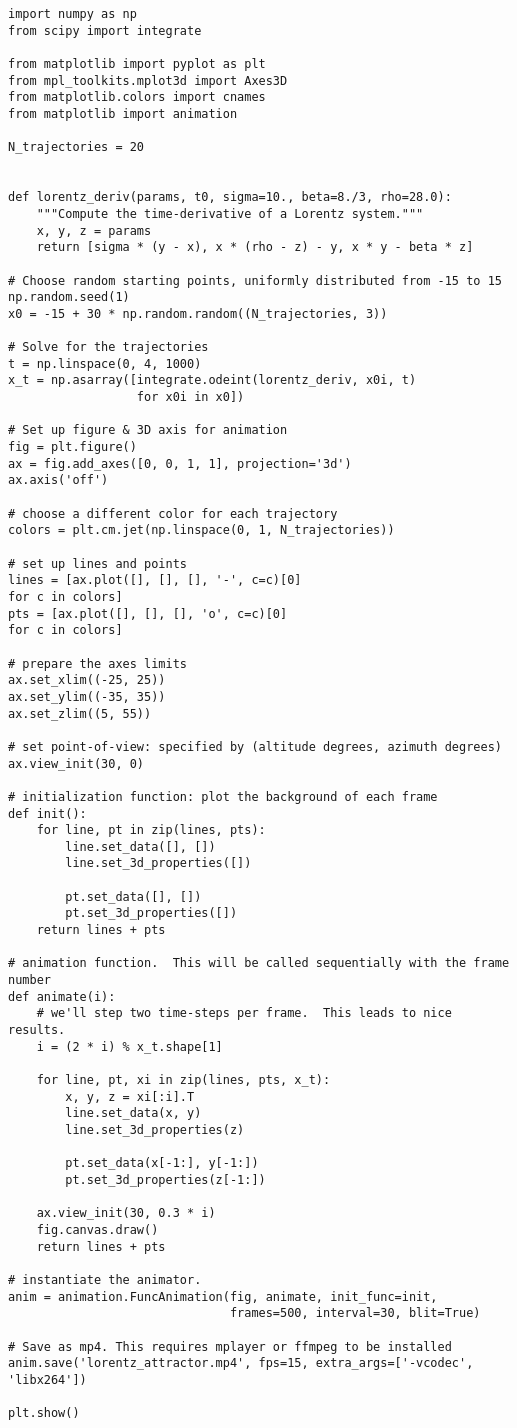 \documentclass[12pt]{article}
\begin{document}
\begin{verbatim}
import numpy as np
from scipy import integrate

from matplotlib import pyplot as plt
from mpl_toolkits.mplot3d import Axes3D
from matplotlib.colors import cnames
from matplotlib import animation

N_trajectories = 20


def lorentz_deriv(params, t0, sigma=10., beta=8./3, rho=28.0):
    """Compute the time-derivative of a Lorentz system."""
    x, y, z = params
    return [sigma * (y - x), x * (rho - z) - y, x * y - beta * z]

# Choose random starting points, uniformly distributed from -15 to 15
np.random.seed(1)
x0 = -15 + 30 * np.random.random((N_trajectories, 3))

# Solve for the trajectories
t = np.linspace(0, 4, 1000)
x_t = np.asarray([integrate.odeint(lorentz_deriv, x0i, t)
                  for x0i in x0])

# Set up figure & 3D axis for animation
fig = plt.figure()
ax = fig.add_axes([0, 0, 1, 1], projection='3d')
ax.axis('off')

# choose a different color for each trajectory
colors = plt.cm.jet(np.linspace(0, 1, N_trajectories))

# set up lines and points
lines = [ax.plot([], [], [], '-', c=c)[0]
for c in colors]
pts = [ax.plot([], [], [], 'o', c=c)[0]
for c in colors]

# prepare the axes limits
ax.set_xlim((-25, 25))
ax.set_ylim((-35, 35))
ax.set_zlim((5, 55))

# set point-of-view: specified by (altitude degrees, azimuth degrees)
ax.view_init(30, 0)

# initialization function: plot the background of each frame
def init():
    for line, pt in zip(lines, pts):
        line.set_data([], [])
        line.set_3d_properties([])

        pt.set_data([], [])
        pt.set_3d_properties([])
    return lines + pts

# animation function.  This will be called sequentially with the frame number
def animate(i):
    # we'll step two time-steps per frame.  This leads to nice results.
    i = (2 * i) % x_t.shape[1]

    for line, pt, xi in zip(lines, pts, x_t):
        x, y, z = xi[:i].T
        line.set_data(x, y)
        line.set_3d_properties(z)

        pt.set_data(x[-1:], y[-1:])
        pt.set_3d_properties(z[-1:])

    ax.view_init(30, 0.3 * i)
    fig.canvas.draw()
    return lines + pts

# instantiate the animator.
anim = animation.FuncAnimation(fig, animate, init_func=init,
                               frames=500, interval=30, blit=True)

# Save as mp4. This requires mplayer or ffmpeg to be installed
anim.save('lorentz_attractor.mp4', fps=15, extra_args=['-vcodec', 'libx264'])

plt.show()

\end{verbatim}
\end{document}
